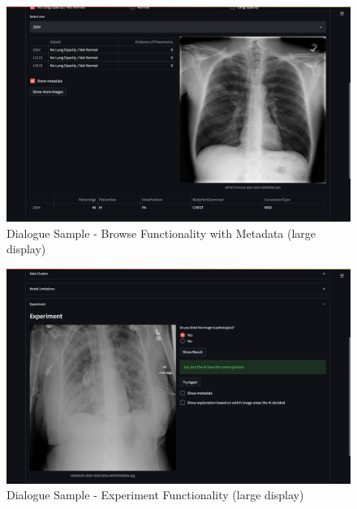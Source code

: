 \documentclass[11pt,a4paper,english]{scrreprt}
\begin{document}
\begin{figure}[htbp]
    \centering
    \includegraphics[width=\textwidth]{img/screenshots/samples/large/l_browse_metadata.png}
    \caption{Dialogue Sample - Browse Functionality with Metadata (large display)}
    \label{fig:samples_l_browse_metadata}
\end{figure}

\begin{figure}[htbp]
    \centering
    \includegraphics[width=\textwidth]{img/screenshots/samples/large/l_experiment.png}
    \caption{Dialogue Sample - Experiment Functionality (large display)}
    \label{fig:samples_l_experiment}
\end{figure}
\end{document}
